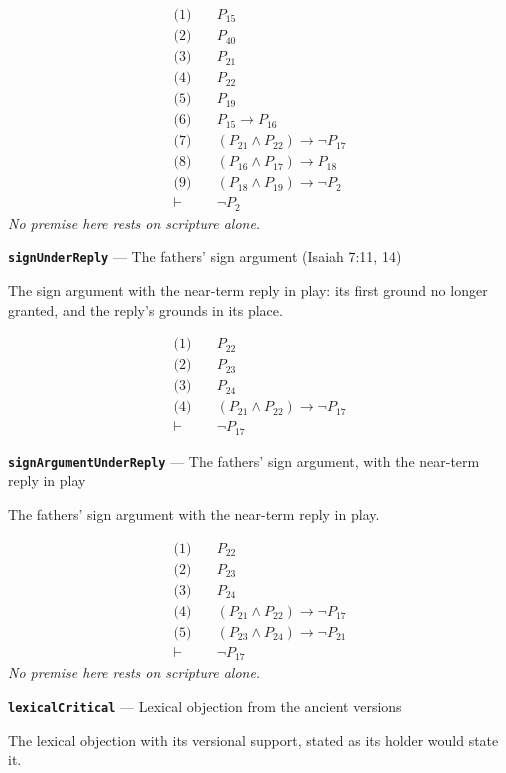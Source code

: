\documentclass[11pt]{article}
\begin{document}
\begin{align*}
  \text{(1)} \quad & P_{15} \\
  \text{(2)} \quad & P_{40} \\
  \text{(3)} \quad & P_{21} \\
  \text{(4)} \quad & P_{22} \\
  \text{(5)} \quad & P_{19} \\
  \text{(6)} \quad & P_{15} \rightarrow P_{16} \\
  \text{(7)} \quad & (P_{21} \land P_{22}) \rightarrow \lnot P_{17} \\
  \text{(8)} \quad & (P_{16} \land P_{17}) \rightarrow P_{18} \\
  \text{(9)} \quad & (P_{18} \land P_{19}) \rightarrow \lnot P_{2} \\
  \vdash \quad & \lnot P_{2}
\end{align*}
\emph{No premise here rests on scripture alone.}
\par\medskip\noindent\textbf{\texttt{sign\allowbreak{}Under\allowbreak{}Reply}} --- The fathers' sign argument (Isaiah 7:11, 14)\par\nobreak\noindent
The sign argument with the near-term reply in play: its first ground no longer granted, and the reply's grounds in its place.

\begin{align*}
  \text{(1)} \quad & P_{22} \\
  \text{(2)} \quad & P_{23} \\
  \text{(3)} \quad & P_{24} \\
  \text{(4)} \quad & (P_{21} \land P_{22}) \rightarrow \lnot P_{17} \\
  \vdash \quad & \lnot P_{17}
\end{align*}
\par\medskip\noindent\textbf{\texttt{sign\allowbreak{}Argument\allowbreak{}Under\allowbreak{}Reply}} --- The fathers' sign argument, with the near-term reply in play\par\nobreak\noindent
The fathers' sign argument with the near-term reply in play.

\begin{align*}
  \text{(1)} \quad & P_{22} \\
  \text{(2)} \quad & P_{23} \\
  \text{(3)} \quad & P_{24} \\
  \text{(4)} \quad & (P_{21} \land P_{22}) \rightarrow \lnot P_{17} \\
  \text{(5)} \quad & (P_{23} \land P_{24}) \rightarrow \lnot P_{21} \\
  \vdash \quad & \lnot P_{17}
\end{align*}
\emph{No premise here rests on scripture alone.}
\par\medskip\noindent\textbf{\texttt{lexical\allowbreak{}Critical}} --- Lexical objection from the ancient versions\par\nobreak\noindent
The lexical objection with its versional support, stated as its holder would state it.
\end{document}
